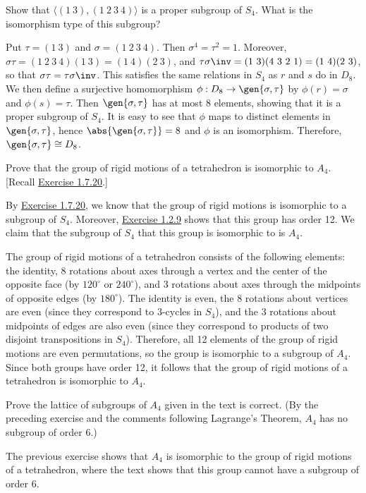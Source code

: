 \begin{problems}
\begin{sol}
    \end{sol}
    \item Show that $\langle (1\ 3),(1\ 2\ 3\ 4)\rangle$ is a proper subgroup of $S_4$. What is the isomorphism type of this subgroup?
    \begin{sol}
        Put $\tau = (1\ 3)$ and $\sigma = (1\ 2\ 3\ 4)$. Then $\sigma^4 = \tau^2 = 1$. Moreover, $\sigma\tau = (1\ 2\ 3\ 4)(1\ 3) = (1\ 4)(2\ 3)$, and $\tau\sigma\inv = (1\ 3)(4\ 3\ 2\ 1) = (1\ 4)(2\ 3)$, so that $\sigma\tau = \tau\sigma\inv$. This satisfies the same relations in $S_4$ as $r$ and $s$ do in $D_8$. We then define a surjective homomorphism $\phi : D_8 \to \gen{\sigma, \tau}$ by $\phi(r) = \sigma$ and $\phi(s) = \tau$. Then $\gen{\sigma, \tau}$ has at most 8 elements, showing that it is a proper subgroup of $S_4$. It is easy to see that $\phi$ maps to distinct elements in $\gen{\sigma, \tau}$, hence $\abs{\gen{\sigma, \tau}} = 8$ and $\phi$ is an isomorphism. Therefore, $\gen{\sigma, \tau} \cong D_8$.
    \end{sol}
    \item Prove that the group of rigid motions of a tetrahedron is isomorphic to $A_4$. [Recall \hyperref[ex1.7.20]{Exercise 1.7.20}.]
    \begin{sol}
        By \hyperref[ex1.7.20]{Exercise 1.7.20}, we know that the group of rigid motions is isomorphic to a subgroup of $S_4$. Moreover, \hyperref[ex1.2.9]{Exercise 1.2.9} shows that this group has order 12. We claim that the subgroup of $S_4$ that this group is isomorphic to is $A_4$. 

        The group of rigid motions of a tetrahedron consists of the following elements: the identity, 8 rotations about axes through a vertex and the center of the opposite face (by $120^\circ$ or $240^\circ$), and 3 rotations about axes through the midpoints of opposite edges (by $180^\circ$). The identity is even, the 8 rotations about vertices are even (since they correspond to $3$-cycles in $S_4$), and the 3 rotations about midpoints of edges are also even (since they correspond to products of two disjoint transpositions in $S_4$). Therefore, all 12 elements of the group of rigid motions are even permutations, so the group is isomorphic to a subgroup of $A_4$. Since both groups have order 12, it follows that the group of rigid motions of a tetrahedron is isomorphic to $A_4$.
    \end{sol}
    \item \label{ex3.5.8} Prove the lattice of subgroups of $A_4$ given in the text is correct. (By the preceding exercise and the comments following Lagrange's Theorem, $A_4$ has no subgroup of order $6$.)
    \begin{sol}
        The previous exercise shows that $A_4$ is isomorphic to the group of rigid motions of a tetrahedron, where the text shows that this group cannot have a subgroup of order 6.


\end{sol}
\end{problems}
